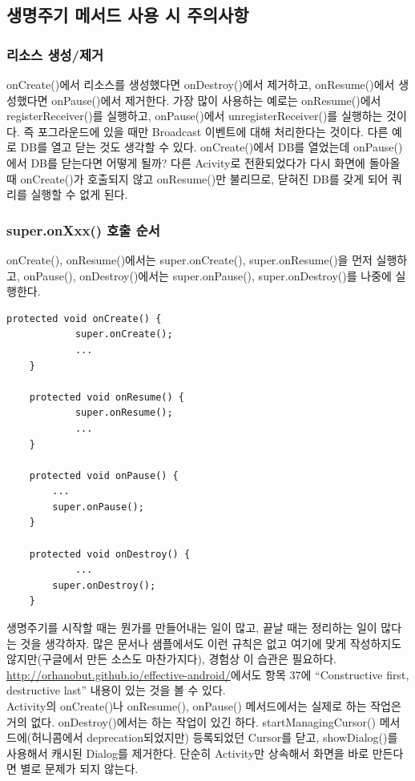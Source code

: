 \subsection{생명주기 메서드 사용 시 주의사항}
\subsubsection{리소스 생성/제거}
onCreate()에서 리소스를 생성했다면 onDestroy()에서 제거하고, onResume()에서 생성했다면 onPause()에서 제거한다.
가장 많이 사용하는 예로는 onResume()에서 registerReceiver()를 실행하고, onPause()에서 unregisterReceiver()를 실행하는 것이다. 
즉 포그라운드에 있을 때만 Broadcast 이벤트에 대해 처리한다는 것이다. 
다른 예로 DB를 열고 닫는 것도 생각할 수 있다. onCreate()에서 DB를 열었는데 onPause()에서 DB를 닫는다면 어떻게 될까?
다른 Acivity로 전환되었다가 다시 화면에 돌아올 때 onCreate()가 호출되지 않고 onResume()만 불리므로, 닫혀진 DB를 갖게 되어 쿼리를 실행할 수 없게 된다.

\subsubsection{super.onXxx() 호출 순서}
onCreate(), onResume()에서는 super.onCreate(), super.onResume()을 먼저 실행하고, 
onPause(), onDestroy()에서는 super.onPause(), super.onDestroy()를 나중에 실행한다.
\begin{lstlisting}[frame=single]
	protected void onCreate() {
    		super.onCreate();
    		...
	}

	protected void onResume() {
    		super.onResume();
    		...
	}

	protected void onPause() {
		...
		super.onPause();
	}

	protected void onDestroy() {
    		...
		super.onDestroy();
	}
\end{lstlisting}
생명주기를 시작할 때는 뭔가를 만들어내는 일이 많고, 끝날 때는 정리하는 일이 많다는 것을 생각하자.
많은 문서나 샘플에서도 이런 규칙은 없고 여기에 맞게 작성하지도 않지만(구글에서 만든 소스도 마찬가지다), 경험상 이 습관은 필요하다. \url{http://orhanobut.github.io/effective-android/}에서도 항목 37에 ``Constructive first, destructive last'' 내용이 있는 것을 볼 수 있다.\\

Activity의 onCreate()나 onResume(), onPause() 메서드에서는 실제로 하는 작업은 거의 없다.
onDestroy()에서는 하는 작업이 있긴 하다. 
startManagingCursor() 메서드에(허니콤에서 deprecation되었지만) 등록되었던 Cursor를 닫고,
showDialog()를 사용해서 캐시된 Dialog를 제거한다.
단순히 Activity만 상속해서 화면을 바로 만든다면 별로 문제가 되지 않는다.\\

